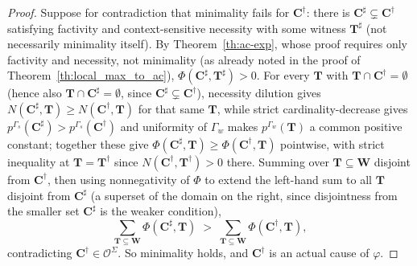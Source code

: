\begin{proof}
Suppose for contradiction that minimality fails for $\mathbf{C}^\dagger$: there is
$\mathbf{C}^\sharp\subsetneq\mathbf{C}^\dagger$ satisfying factivity and
context-sensitive necessity with some witness $\mathbf{T}^\sharp$ (not necessarily
minimality itself). By Theorem~\ref{th:ac-exp}, whose proof requires only factivity
and necessity, not minimality (as already noted in the proof of
Theorem~\ref{th:local_max_to_ac}), $\Phi(\mathbf{C}^\sharp,\mathbf{T}^\sharp)>0$. For every
$\mathbf{T}$ with $\mathbf{T}\cap\mathbf{C}^\dagger=\emptyset$ (hence also
$\mathbf{T}\cap\mathbf{C}^\sharp=\emptyset$, since $\mathbf{C}^\sharp\subsetneq\mathbf{C}^\dagger$),
necessity dilution gives $N(\mathbf{C}^\sharp,\mathbf{T})\geq N(\mathbf{C}^\dagger,\mathbf{T})$
for that same $\mathbf{T}$, while strict cardinality-decrease gives
$p^{\Gamma_s}(\mathbf{C}^\sharp)>p^{\Gamma_s}(\mathbf{C}^\dagger)$ and uniformity of
$\Gamma_w$ makes $p^{\Gamma_w}(\mathbf{T})$ a common positive constant; together these
give $\Phi(\mathbf{C}^\sharp,\mathbf{T})\geq\Phi(\mathbf{C}^\dagger,\mathbf{T})$
pointwise, with strict inequality at $\mathbf{T}=\mathbf{T}^\dagger$ since
$N(\mathbf{C}^\dagger,\mathbf{T}^\dagger)>0$ there. Summing over
$\mathbf{T}\subseteq\mathbf{W}$ disjoint from $\mathbf{C}^\dagger$, then using
nonnegativity of $\Phi$ to extend the left-hand sum to all $\mathbf{T}$ disjoint from
$\mathbf{C}^\sharp$ (a superset of the domain on the right, since disjointness from the
smaller set $\mathbf{C}^\sharp$ is the weaker condition),
\[
\sum_{\mathbf{T}\subseteq\mathbf{W}} \Phi(\mathbf{C}^\sharp,\mathbf{T})
\;>\;
\sum_{\mathbf{T}\subseteq\mathbf{W}} \Phi(\mathbf{C}^\dagger,\mathbf{T}),
\]
contradicting $\mathbf{C}^\dagger\in\mathcal{O}^\Sigma$. So minimality holds, and
$\mathbf{C}^\dagger$ is an actual cause of $\varphi$.
\end{proof}

